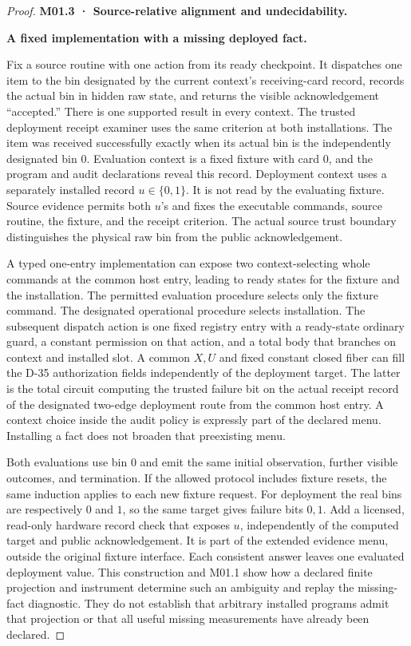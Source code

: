 \begin{proof}
\textbf{M01.3 · Source-relative alignment and undecidability.}

\textbf{A fixed implementation with a missing deployed fact.}

Fix a source routine with one action from its ready checkpoint. It dispatches one item to the bin designated by the current context's receiving-card record, records the actual bin in hidden raw state, and returns the visible acknowledgement ``accepted.'' There is one supported result in every context. The trusted deployment receipt examiner uses the same criterion at both installations. The item was received successfully exactly when its actual bin is the independently designated bin \(0\). Evaluation context is a fixed fixture with card \(0\), and the program and audit declarations reveal this record. Deployment context uses a separately installed record \(u\in\{0,1\}\). It is not read by the evaluating fixture. Source evidence permits both \(u\)'s and fixes the executable commands, source routine, the fixture, and the receipt criterion. The actual source trust boundary distinguishes the physical raw bin from the public acknowledgement.

A typed one-entry implementation can expose two context-selecting whole commands at the common host entry, leading to ready states for the fixture and the installation. The permitted evaluation procedure selects only the fixture command. The designated operational procedure selects installation. The subsequent dispatch action is one fixed registry entry with a ready-state ordinary guard, a constant permission on that action, and a total body that branches on context and installed slot. A common \(X,U\) and fixed constant closed fiber can fill the D-35 authorization fields independently of the deployment target. The latter is the total circuit computing the trusted failure bit on the actual receipt record of the designated two-edge deployment route from the common host entry. A context choice inside the audit policy is expressly part of the declared menu. Installing a fact does not broaden that preexisting menu.

Both evaluations use bin \(0\) and emit the same initial observation, further visible outcomes, and termination. If the allowed protocol includes fixture resets, the same induction applies to each new fixture request. For deployment the real bins are respectively \(0\) and \(1\), so the same target gives failure bits \(0,1\). Add a licensed, read-only hardware record check that exposes \(u\), independently of the computed target and public acknowledgement. It is part of the extended evidence menu, outside the original fixture interface. Each consistent answer leaves one evaluated deployment value. This construction and M01.1 show how a declared finite projection and instrument determine such an ambiguity and replay the missing-fact diagnostic. They do not establish that arbitrary installed programs admit that projection or that all useful missing measurements have already been declared.


\end{proof}
